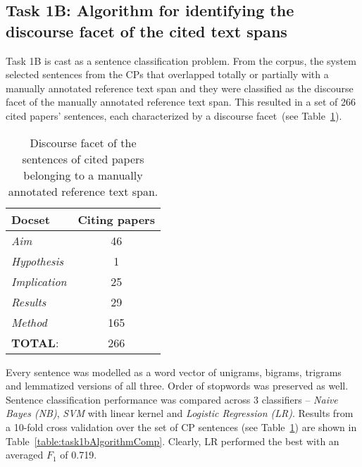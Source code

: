 \documentclass[11pt]{article}
\begin{document}
\subsection{Task 1B: Algorithm for identifying the discourse facet 
  of the cited text spans}
Task 1B is cast as a sentence classification problem. From the 
corpus, the system selected sentences from the CPs that overlapped 
totally or partially with a manually annotated reference text span 
and they were classified as the discourse facet of the manually 
annotated reference text span. This resulted in a set of 266 cited 
papers' sentences, each characterized by a discourse 
facet~(see Table~\ref{table:task1bSentDistrib}).

\begin{table}[h]\footnotesize
  \begin{center}
  \begin{tabular}{ |l | c |}
    \hline
    Docset & Citing papers \\ \hline
    \textit{Aim} & 46 \\ \hline
    \textit{Hypothesis} & 1 \\ \hline
    \textit{Implication} & 25 \\ \hline
    \textit{Results} & 29 \\ \hline
    \textit{Method} & 165 \\ \hline
    \textbf{TOTAL}: & 266 \\ \hline
    \hline
  \end{tabular}
  \caption{Discourse facet of the sentences of cited papers belonging to a manually annotated reference text span.}
  \label{table:task1bSentDistrib}
  \end{center}
\end{table}

Every sentence was modelled as a word vector of unigrams, 
bigrams, trigrams and lemmatized versions of all three.
Order of stopwords was preserved as well.
Sentence classification performance was 
compared across 3 classifiers -- \textit{Naive Bayes (NB)}, \textit{SVM} with linear kernel 
and \textit{Logistic Regression (LR)}. Results from a 10-fold cross validation over the 
set of CP sentences (see Table~\ref{table:task1bSentDistrib}) are shown in Table~\ref{table:task1bAlgorithmComp}. 
Clearly, LR performed the best with an averaged $F_1$ of 0.719.
\end{document}
